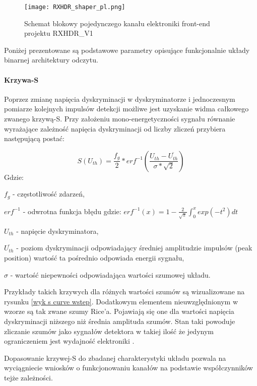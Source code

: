 \begin{figure}
        \texttt{[image: RXHDR\_shaper\_pl.png]}
        \caption{Schemat blokowy pojedynczego kanału elektroniki front-end projektu RXHDR\_V1}
        \label{RXHDR schema}
\end{figure}

Poniżej prezentowane są podstawowe parametry opisujące funkcjonalnie układy binarnej architektury odczytu.

\paragraph{Krzywa-S}

Poprzez zmianę napięcia dyskryminacji w dyskryminatorze i jednoczesnym  pomiarze kolejnych impulsów detekcji możliwe jest uzyskanie widma całkowego zwanego krzywą-S. Przy założeniu mono-energetyczności sygnału równanie wyrażające zależność napięcia dyskryminacji od liczby zliczeń przybiera następującą postać:

\begin{equation}
        \label{wste krzywa s}
        S(U_{th}) = \frac{f_g}{2} * erf^{-1}(\frac{U_{th}-\overline{U_{th}}}{\sigma*\sqrt{2}})
\end{equation}
Gdzie:
\begin{description}
        \item $f_g$ - częstotliwość zdarzeń,
        \item $erf^{-1}$ - odwrotna funkcja błędu gdzie: $erf^{-1}(x) = 1 - \frac{2}{\sqrt{\pi}} \int^x_0 exp(-t^2)dt $
        \item $U_{th}$ - napięcie dyskryminatora,
        \item $\overline{U_{th}}$ - poziom dyskryminacji odpowiadający średniej amplitudzie impulsów (peak position) wartość ta pośrednio odpowiada energii sygnału, 
        \item  $\sigma$ - wartość niepewności odpowiadająca wartości szumowej układu. 
\end{description}

Przykłady takich krzywych dla różnych wartości szumów są wizualizowane na rysunku \ref{wyk s curve wstep}. Dodatkowym elementem nieuwzględnionym w wzorze są tak zwane szumy Rice’a. Pojawiają się one dla wartości napięcia dyskryminacji niższego niż średnia amplituda szumów. Stan taki powoduje zliczanie szumów jako sygnałów detektora w takiej ilość że jedynym ograniczeniem jest wydajność elektroniki \cite{wiocek doctorat}.

Dopasowanie krzywej-S do zbadanej charakterystyki układu pozwala na wyciągniecie wniosków o funkcjonowaniu kanałów na podstawie współczynników tejże zależności.   

